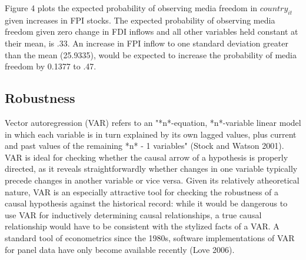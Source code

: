 \documentclass[12pt,a4paper]{article}\usepackage[]{graphicx}\usepackage[]{color}
\begin{document}
Figure 4 plots the expected probability of observing media freedom in $country_{it}$ given increases in FPI stocks. The expected probability of observing media freedom given zero change in FDI inflows and all other variables held constant at their mean, is .33. An increase in FPI inflow to one standard deviation greater than the mean (25.9335), would be expected to increase the probability of media freedom by 0.1377 to .47.

% 
% 


\subsection{Robustness}

Vector autoregression (VAR) refers to an "*n*-equation, *n*-variable linear model in which each variable is in turn explained by its own lagged values, plus current and past values of the remaining *n* - 1 variables" (Stock and Watson 2001). VAR is ideal for checking whether the causal arrow of a hypothesis is properly directed, as it reveals straightforwardly whether changes in one variable typically precede changes in another variable or vice versa. Given its relatively atheoretical nature, VAR is an especially attractive tool for checking the robustness of a causal hypothesis against the historical record: while it would be dangerous to use VAR for inductively determining causal relationships, a true causal relationship would have to be consistent with the stylized facts of a VAR. A standard tool of econometrics since the 1980s, software implementations of VAR for panel data have only become available recently (Love 2006).
\end{document}

